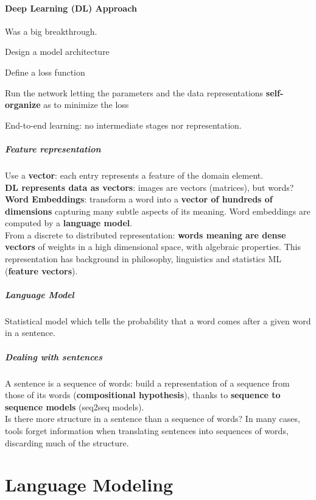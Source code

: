 \documentclass[10pt]{report}
\begin{document}
\paragraph{Deep Learning (DL) Approach} Was a big breakthrough.\begin{list}{}{}
	\item Design a model architecture
	\item Define a loss function
	\item Run the network letting the parameters and the data representations \textbf{self-organize} as to minimize the loss
\end{list}
End-to-end learning: no intermediate stages nor representation.
\subparagraph{Feature representation} Use a \textbf{vector}: each entry represents a feature of the domain element.\\
\textbf{DL represents data as vectors}: images are vectors (matrices), but words? \textbf{Word Embeddings}: transform a word into a \textbf{vector of hundreds of dimensions} capturing many subtle aspects of its meaning. Word embeddings are computed by a \textbf{language model}.\\
From a discrete to distributed representation: \textbf{words meaning are dense vectors} of weights in a high dimensional space, with algebraic properties. This representation has background in philosophy, linguistics and statistics ML (\textbf{feature vectors}).
\subparagraph{Language Model} Statistical model which tells the probability that a word comes after a given word in a sentence.
\subparagraph{Dealing with sentences} A sentence is a sequence of words: build a representation of a sequence from those of its words (\textbf{compositional hypothesis}), thanks to \textbf{sequence to sequence models} (seq2seq models).\\
Is there more structure in a sentence than a sequence of words? In many cases, tools forget information when translating sentences into sequences of words, discarding much of the structure.
\section{Language Modeling}
\end{document}
